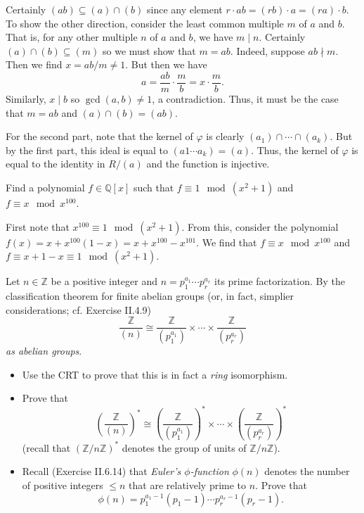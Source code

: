 \documentclass[../../master.tex]{subfiles}
\begin{document}
\begin{solution}
    Certainly $(ab) \subseteq (a) \cap (b)$ since any element $r \cdot ab = (rb) \cdot a = (ra) \cdot b$.
    To show the other direction, consider the least common multiple $m$ of $a$ and $b$.
    That is, for any other multiple $n$ of $a$ and $b$, we have $m \mid n$.
    Certainly $(a) \cap (b) \subseteq (m)$ so we must show that $m = ab$.
    Indeed, suppose $ab \nmid m$. Then we find $x = ab / m \neq 1$.
    But then we have
    \[
    a = \frac{ab}{m} \cdot \frac{m}{b} = x \cdot \frac{m}{b}.
    \]
    Similarly, $x \mid b$ so $\gcd(a, b) \neq 1$, a contradiction.
    Thus, it must be the case that $m = ab$ and $(a) \cap (b) = (ab)$.

    For the second part, note that the kernel of $\varphi$ is clearly $(a_1) \cap \cdots \cap (a_k)$.
    But by the first part, this ideal is equal to $(a1 \cdots a_k) = (a)$.
    Thus, the kernel of $\varphi$ is equal to the identity in $R / (a)$ and the function is injective.
\end{solution}

\begin{problem}
    Find a polynomial $f \in \mathbb{Q}[x]$ such that $f \equiv 1 \mod (x^2 + 1)$ and $f \equiv x \mod x^{100}$.
\end{problem}

\begin{solution}
    First note that $x^{100} \equiv 1 \mod (x^2 + 1)$.
    From this, consider the polynomial $f(x) = x + x^{100}(1 - x) = x + x^{100} - x^{101}$.
    We find that $f \equiv x \mod x^{100}$ and $f \equiv x + 1 - x \equiv 1 \mod (x^2 + 1)$.
\end{solution}

\begin{problem}
    Let $n \in \mathbb{Z}$ be a positive integer and $n = p_1^{a_1} \cdots  p_r^{a_r}$ its prime factorization.
    By the classification theorem for finite abelian groups (or, in fact, simplier considerations; cf. Exercise II.4.9)
    \[
        \frac{\mathbb{Z}}{(n)} \cong \frac{\mathbb{Z}}{(p_1^{a_1})} \times \cdots \times \frac{\mathbb{Z}}{(p_r^{a_r})}
    \]
    \textit{as abelian groups}.
    \begin{itemize}
        \item Use the CRT to prove that this is in fact a \textit{ring} isomorphism.
        \item Prove that
            \[
                \left( \frac{\mathbb{Z}}{(n)}\right)^{*} \cong \left( \frac{\mathbb{Z}}{(p_1^{a_1})}\right)^{*} \times \cdots \times \left( \frac{\mathbb{Z}}{(p_r^{a_r})}\right)^{*}
            \]
            (recall that $(\mathbb{Z} / n\mathbb{Z})^{*}$ denotes the group of units of $\mathbb{Z} / n\mathbb{Z}$).
        \item Recall (Exercise II.6.14) that \textit{Euler's $\phi$-function} $\phi(n)$ denotes the number of positive integers $\leq n$ that are relatively prime to $n$. 
            Prove that
            \[
                \phi(n) = p_1^{a_1 - 1}(p_1 - 1) \cdots p_r^{a_r - 1}(p_r - 1).
            \]
    \end{itemize}
\end{problem}
\end{document}
